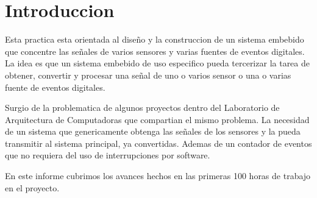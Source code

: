 \section{Introduccion}
Esta practica esta orientada al dise\~no y la construccion de un sistema embebido que concentre las se\~nales de varios sensores y varias fuentes de eventos digitales. La idea es que un sistema embebido de uso especifico pueda tercerizar la tarea de obtener, convertir y procesar una se\~nal de uno o varios sensor o una o varias fuente de eventos digitales.

Surgio de la problematica de algunos proyectos dentro del Laboratorio de Arquitectura de Computadoras que compartian el mismo problema. La necesidad de un sistema que genericamente obtenga las se\~nales de los sensores y la pueda transmitir al sistema principal, ya convertidas. Ademas de un contador de eventos que no requiera del uso de interrupciones por software.

En este informe cubrimos los avances hechos en las primeras 100 horas de trabajo en el proyecto.